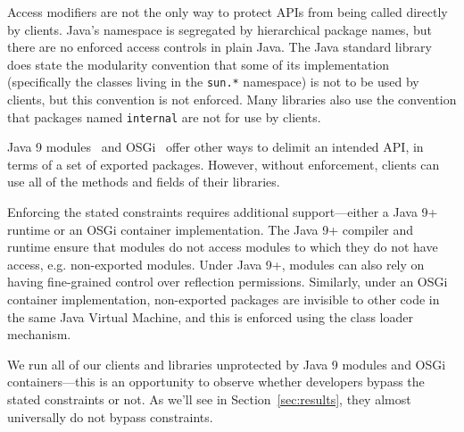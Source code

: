 
Access modifiers are not the only way to protect APIs from being
called directly by clients.  Java's namespace is segregated by
hierarchical package names, but there are no enforced access controls
in plain Java. The Java standard library does state the modularity convention
that some of its implementation (specifically the classes living in
the \texttt{sun.*} namespace) is not to be used by clients, but this
convention is not enforced. Many libraries also use the convention that packages
named \texttt{internal} are not for use by clients. 

Java 
9 modules~\cite{corporation17:_java_platf_modul_system_jsr} and OSGi~\cite{alliance20:_osgi_core_releas_specif} offer other ways to delimit an intended API, in terms of a set of exported
packages. However, without enforcement, clients can use
all of the methods and fields of their libraries.

Enforcing the stated constraints requires additional support---either
a Java 9+ runtime or an OSGi container implementation. The Java 9+
compiler and runtime ensure that modules do not access modules to
which they do not have access, e.g. non-exported modules. Under Java
9+, modules can also rely on having fine-grained control over
reflection permissions. Similarly, under an OSGi container implementation,
non-exported packages are invisible to other code in the same Java
Virtual Machine, and this is enforced using the class loader
mechanism. 

We run all of our clients and libraries unprotected by Java 9 modules
and OSGi containers---this is an opportunity to observe whether developers
bypass the stated constraints or not. As we'll see in Section~\ref{sec:results}, 
they almost universally do not bypass constraints.





